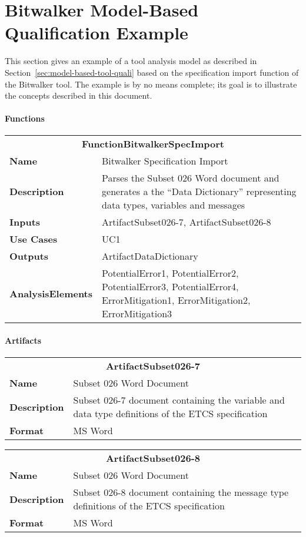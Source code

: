 \newpage
\section{Bitwalker Model-Based Qualification Example}
\label{sec:bitwalker-example}

This section gives an example of a tool analysis model as described in Section~\ref{sec:model-based-tool-quali} based on the specification import function of the Bitwalker tool. The example is by no means complete; its goal is to illustrate the concepts described in this document.

\paragraph{Functions}

\begin{tabular}{|lp{}|}
\hline
\multicolumn{2}{|c|}{\bf FunctionBitwalkerSpecImport}\\
\bf Name& Bitwalker Specification Import\\
\bf Description&Parses the Subset 026 Word document and generates a the ``Data Dictionary'' representing data types, variables and messages\\
\bf Inputs&ArtifactSubset026-7, ArtifactSubset026-8\\
\bf Use Cases&UC1\\
\bf Outputs&ArtifactDataDictionary\\
\bf AnalysisElements&PotentialError1, PotentialError2, PotentialError3, PotentialError4, ErrorMitigation1, ErrorMitigation2, ErrorMitigation3\\
\hline
\end{tabular}

\paragraph{Artifacts}

\begin{tabular}{|lp{}|}
\hline
\multicolumn{2}{|c|}{\bf ArtifactSubset026-7}\\
\bf Name& Subset 026 Word Document\\
\bf Description&Subset 026-7 document containing the variable and data type definitions of the ETCS specification\\
\bf Format&MS Word\\
\hline
\end{tabular}


\begin{tabular}{|lp{}|}
\hline
\multicolumn{2}{|c|}{\bf ArtifactSubset026-8}\\
\bf Name& Subset 026 Word Document\\
\bf Description&Subset 026-8 document containing the message type definitions of the ETCS specification\\
\bf Format&MS Word\\
\hline
\end{tabular}

